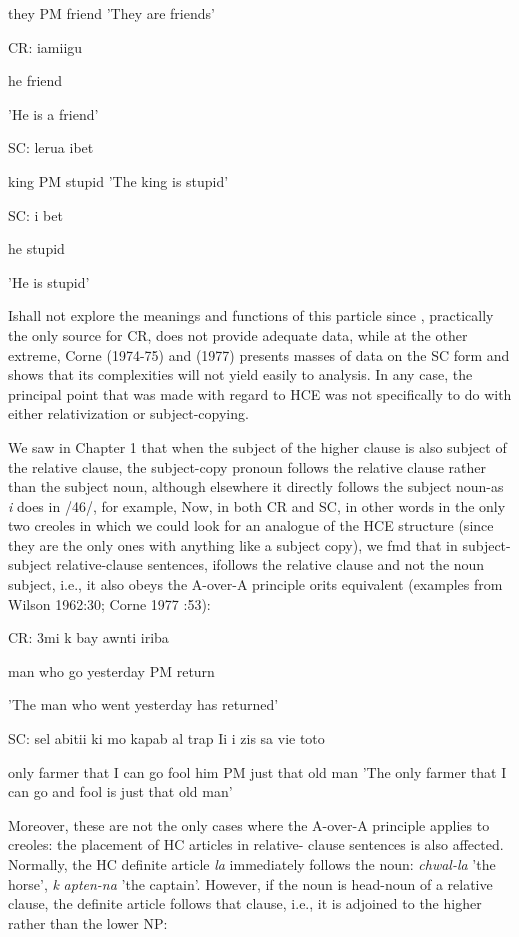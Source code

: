 they PM friend 'They are friends'

\ea\label{ex:45}
 CR: iamiigu
\glt
\z

he friend

'He is a friend'


\ea\label{ex:46}
 SC: lerua ibet
\glt
\z

king PM stupid 'The king is stupid'

\ea\label{ex:47}
 SC: i bet
\glt
\z

he stupid

'He is stupid'

Ishall not explore the meanings and functions of this particle since \citet{Wilson1962}, practically the only source for CR, does not provide adequate data, while at the other extreme, Corne (1974-75) and (1977) presents masses of data on the SC form and shows that its complexities will not yield easily to analysis. In any case, the principal point that was made with regard to HCE was not specifically to do with either relativization or subject-copying.

We saw in Chapter 1 that when the subject of the higher clause is also subject of the relative clause, the subject-copy pronoun follows the relative clause rather than the subject noun, although elsewhere it directly follows the subject noun-as \textit{i} does in /46/, for example, Now, in both CR and SC, in other words in the only two creoles in which we could look for an analogue of the HCE structure (since they are the only ones with anything like a subject copy), we fmd that in subject-subject relative-clause sentences, ifollows the relative clause and not the noun subject, i.e., it also obeys the A-over-A principle orits equivalent (examples from Wilson 1962:30; Corne 1977 :53):

\ea\label{ex:48}
 CR: 3mi k bay awnti iriba
\glt
\z

man who go yesterday PM return

'The man who went yesterday has returned'

\ea\label{ex:49}
 SC: sel abitii ki mo kapab al trap Ii i zis sa vie toto
\glt
\z

only farmer that I can go fool him PM just that old man 'The only farmer that I can go and fool is just that old man'

Moreover, these are not the only cases where the A-over-A principle applies to creoles: the placement of HC articles in relative-%
clause sentences is also affected. Normally, the HC definite article \textit{la }immediately follows the noun: \textit{chwal-la} 'the horse', \textit{k} \textit{apten-na} 'the captain'. However, if the noun is head-noun of a relative clause, the definite article follows that clause, i.e., it is adjoined to the higher rather than the lower NP:

